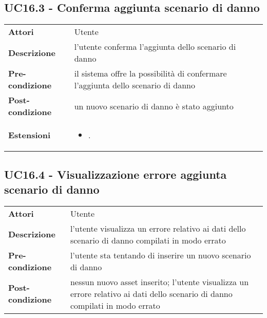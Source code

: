 \subsection{UC16.3 - Conferma aggiunta scenario di danno}
\label{sssec:UC16.3}
\def\arraystretch{1.5}
\begin{tabularx}{\textwidth}{l|p{}}
\rowcolor{I} \multicolumn{2}{c}{\color{white}\textbf{UC16.3 - Conferma aggiunta scenario di danno}} \\
\toprule
\endhead
\textbf{Attori} & Utente\\
\textbf{Descrizione} & l'utente conferma l'aggiunta dello scenario di danno\\
\textbf{Pre-condizione} & il sistema offre la possibilità di confermare l'aggiunta dello scenario di danno\\
\textbf{Post-condizione} & un nuovo scenario di danno è stato aggiunto\\
\textbf{Estensioni} & \vspace{-1.2em}\begin{itemize}[leftmargin=*,noitemsep,nosep]
\item \nameref{sssec:UC16.4}.
\end{itemize}\\
\bottomrule
\end{tabularx}
\subsection{UC16.4 - Visualizzazione errore aggiunta scenario di danno}
\label{sssec:UC16.4}
\def\arraystretch{1.5}
\begin{tabularx}{\textwidth}{l|p{}}
\rowcolor{I} \multicolumn{2}{c}{\color{white}\textbf{UC16.4 - Visualizzazione errore aggiunta scenario di danno}} \\
\toprule
\endhead
\textbf{Attori} & Utente\\
\textbf{Descrizione} & l'utente visualizza un errore relativo ai dati dello scenario di danno compilati in modo errato\\
\textbf{Pre-condizione} & l'utente sta tentando di inserire un nuovo scenario di danno\\
\textbf{Post-condizione} & nessun nuovo asset inserito; l'utente visualizza un errore relativo ai dati dello scenario di danno compilati in modo errato\\
\bottomrule
\end{tabularx}
